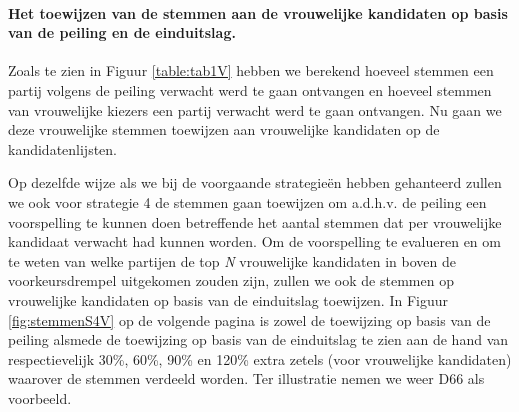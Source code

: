 \paragraph{Het toewijzen van de stemmen aan de vrouwelijke kandidaten op basis van de peiling en de einduitslag.}
Zoals te zien in Figuur \ref{table:tab1V} hebben we berekend hoeveel stemmen een partij volgens de peiling verwacht werd te gaan ontvangen en hoeveel stemmen van vrouwelijke kiezers een partij verwacht werd te gaan ontvangen. Nu gaan we deze vrouwelijke stemmen toewijzen aan vrouwelijke kandidaten op de kandidatenlijsten.

Op dezelfde wijze als we bij de voorgaande strategie\"{e}n hebben gehanteerd zullen we ook voor strategie 4 de stemmen gaan toewijzen om a.d.h.v. de peiling een voorspelling te kunnen doen betreffende het aantal stemmen dat per vrouwelijke kandidaat verwacht had kunnen worden. Om de voorspelling te evalueren en om te weten van welke partijen de top \textit{N} vrouwelijke kandidaten in boven de voorkeursdrempel uitgekomen zouden zijn, zullen we ook de stemmen op vrouwelijke kandidaten op basis van de einduitslag toewijzen. In Figuur \ref{fig:stemmenS4V} op de volgende pagina is zowel de toewijzing op basis van de peiling alsmede de toewijzing op basis van de einduitslag te zien aan de hand van respectievelijk 30\%, 60\%, 90\% en 120\% extra zetels (voor vrouwelijke kandidaten) waarover de stemmen verdeeld worden. Ter illustratie nemen we weer D66 als voorbeeld. 

